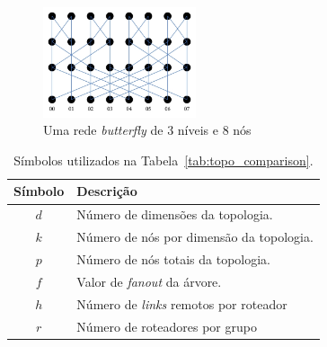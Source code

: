 \documentclass[
	12pt,				%
	openright,			%
	twoside,			%
	a4paper,			%
	english,			%
	brazil,				%
	]{abntex2}
\newcommand{\links}{\textit{links}\xspace}
\begin{document}
\begin{figure} [h]
    \includegraphics[width=0.4\textwidth]{bfly}
    \centering
    \caption[Uma rede \textit{Buttefly}]{Uma rede \textit{butterfly} de 3 níveis e 8 nós~\cite{Liu:bfly}}
    \label{fig:bfly}
\end{figure}

\setlength{\tabcolsep}{0.5em}
\begin{table}[h]
    \centering
    \begin{tabular}{c l}
        \toprule
        \textbf{Símbolo} &    \textbf{Descrição}  \\ \midrule
        $d$ & Número de dimensões da topologia.  \\ %
        $k$ & Número de nós por dimensão da topologia.  \\ %
        $p$ & Número de nós totais da topologia.  \\ %
        $f$ & Valor de \textit{fanout} da árvore.  \\ %
        $h$ & Número de \links remotos por roteador \\ %
        $r$ & Número de roteadores por grupo \\ \bottomrule
    \end{tabular}
    \caption[Símbolos utilizados na Tabela~\ref{tab:topo_comparison}]{Símbolos utilizados na Tabela~\ref{tab:topo_comparison}.}
    \label{tab:topo_symbols}
\end{table}
\end{document}
